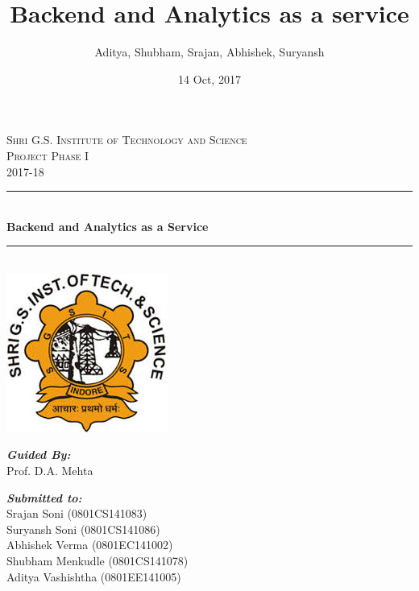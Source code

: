 \documentclass[a4paper,12pt]{report}
\title{Backend and Analytics as a service}
\author{Aditya, Shubham, Srajan, Abhishek, Suryansh}
\date{14 Oct, 2017}
\begin{document}
    
    \begin{titlepage}
      \newcommand{\HRule}{\rule{\linewidth}{0.5mm}} %
      \center
      \textsc{\LARGE Shri G.S. Institute of Technology and Science}\\[1.5cm]
      \textsc{\Large Project Phase I}\\[0.5cm]
      \textsc{\large 2017-18}\\[0.5cm]
      \HRule \\[0.4cm]
      { \huge \bfseries Backend and Analytics as a Service}\\[0.4cm] %
      \HRule \\[1.5cm]
      \includegraphics{images/logo.jpg}\\[5cm] %
      \begin{minipage}{0.4\textwidth}
      \begin{flushleft} \large
      \textbf{\emph{Guided By:}}\\
      Prof. D.A. Mehta
      \end{flushleft}
      \end{minipage}
      \begin{minipage}{0.4\textwidth}
      \begin{flushright} \normalsize
      \textbf{\emph{Submitted to:}} \\
      Srajan Soni (0801CS141083)\\
      Suryansh Soni (0801CS141086)\\
      Abhishek Verma (0801EC141002)\\
      Shubham Menkudle (0801CS141078)\\
      Aditya Vashishtha (0801EE141005)\\                     
      \end{flushright}
      \end{minipage}\\[2cm]            
      \vfill       
    \end{titlepage}    
    
\end{document}
